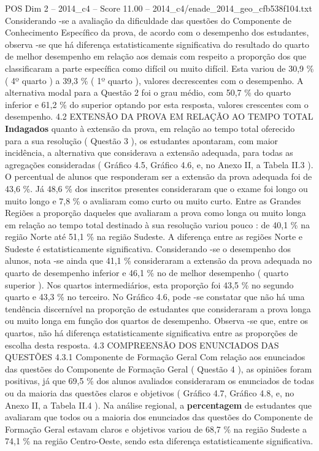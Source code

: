 \begin{textsample}{POS Dim 2 – 2014\_c4 – Score 11.00 – 2014\_c4/enade\_2014\_geo\_cfb538f104.txt}
Considerando -se a avaliação da dificuldade das questões do Componente de Conhecimento Específico da prova, de acordo com o desempenho dos estudantes, observa -se que há diferença estatisticamente significativa do resultado do quarto de melhor desempenho em relação aos demais com respeito a proporção dos que classificaram a parte específica como difícil ou muito difícil.
Esta variou de 30,9 \% ( 4º quarto ) a 39,3 \% ( 1º quarto ), valores decrescentes com o desempenho.
A alternativa modal para a Questão 2 foi o grau médio, com 50,7 \% do quarto inferior e 61,2 \% do superior optando por esta resposta, valores crescentes com o desempenho. 4.2 EXTENSÃO DA PROVA EM RELAÇÃO AO TEMPO TOTAL \textbf{Indagados} quanto à extensão da prova, em relação ao tempo total oferecido para a sua resolução ( Questão 3 ), os estudantes apontaram, com maior incidência, a alternativa que considerava a extensão adequada, para todas as agregações consideradas ( Gráfico 4.5, Gráfico 4.6, e, no Anexo II, a Tabela II.3 ).
O percentual de alunos que responderam ser a extensão da prova adequada foi de 43,6 \%.
Já 48,6 \% dos inscritos presentes consideraram que o exame foi longo ou muito longo e 7,8 \% o avaliaram como curto ou muito curto.
Entre as Grandes Regiões a proporção daqueles que avaliaram a prova como longa ou muito longa em relação ao tempo total destinado à sua resolução variou pouco : de 40,1 \% na região Norte até 51,1 \% na região Sudeste.
A diferença entre as regiões Norte e Sudeste é estatisticamente significativa.
Considerando -se o desempenho dos alunos, nota -se ainda que 41,1 \% consideraram a extensão da prova adequada no quarto de desempenho inferior e 46,1 \% no de melhor desempenho ( quarto superior ).
Nos quartos intermediários, esta proporção foi 43,5 \% no segundo quarto e 43,3 \% no terceiro.
No Gráfico 4.6, pode -se constatar que não há uma tendência discernível na proporção de estudantes que consideraram a prova longa ou muito longa em função dos quartos de desempenho.
Observa -se que, entre os quartos, não há diferença estatisticamente significativa entre as proporções de escolha desta resposta. 4.3 COMPREENSÃO DOS ENUNCIADOS DAS QUESTÕES 4.3.1 Componente de Formação Geral Com relação aos enunciados das questões do Componente de Formação Geral ( Questão 4 ), as opiniões foram positivas, já que 69,5 \% dos alunos avaliados consideraram os enunciados de todas ou da maioria das questões claros e objetivos ( Gráfico 4.7, Gráfico 4.8, e, no Anexo II, a Tabela II.4 ).
Na análise regional, a \textbf{percentagem} de estudantes que avaliaram que todos ou a maioria dos enunciados das questões do Componente de Formação Geral estavam claros e objetivos variou de 68,7 \% na região Sudeste a 74,1 \% na região Centro-Oeste, sendo esta diferença estatisticamente significativa.

\end{textsample}
